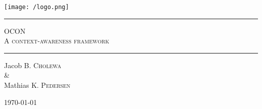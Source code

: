 \begin{titlepage}
\begin{center}

\vspace{2cm}

\centering\texttt{[image: /logo.png]}

\vspace{1cm}

\rule{\linewidth}{0.6mm}

\textsc{\LARGE OCON}\\
\textsc{\large A context-awareness framework}
\vspace{0.2cm}
\rule{\linewidth}{0.4mm}

Jacob B. \textsc{Cholewa}
\\ \& \\
Mathias K. \textsc{Pedersen}

\vfill

\large \today
\end{center}


\end{titlepage}